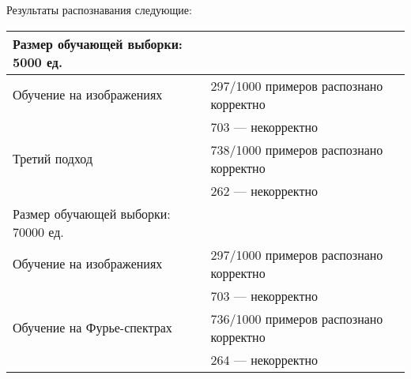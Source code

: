\documentclass[12pt,a4paper]{article}
\begin{document}
\noindent
Результаты распознавания следующие:
\begin{table}[H]
\begin{tabular}{|ll|}
\hline
Размер обучающей выборки: 5000 ед. & \\
\hline\hline
Обучение на изображениях &297/1000 примеров распознано корректно\\
&703 --- некорректно\\
Третий подход &738/1000 примеров распознано корректно\\
&262 --- некорректно\\
\hline\hline
Размер обучающей выборки: 70000 ед. &\\
\hline\hline
Обучение на изображениях &297/1000 примеров распознано корректно\\
&703 --- некорректно\\
Обучение на Фурье-спектрах &736/1000 примеров распознано корректно\\
&264 --- некорректно\\
\hline
\end{tabular}
\end{table}
 
\end{document}
